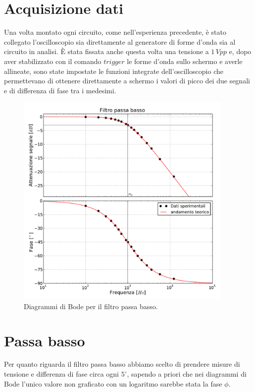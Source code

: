 \section{Acquisizione dati}
Una volta montato ogni circuito, come nell'esperienza precedente, è stato collegato l'oscilloscopio sia direttamente al generatore di forme d'onda sia al circuito in analisi. 
\`E stata fissata anche questa volta una tensione a $1\,Vpp$ e, dopo aver stabilizzato con il comando $trigger$ le forme d'onda sullo schermo e averle allineate, sono state impostate le funzioni integrate dell'oscilloscopio che permettevano di ottenere direttamente a schermo i valori di picco dei due segnali e di differenza di fase tra i medesimi.\phantom{maperchédevosempreognivoltamettereapostolecoseconunphantom?melospieghi?chestoria!}\begin{figure}
    \includegraphics[width=105mm]{low.pdf}
    \caption{Diagrammi di Bode per il filtro passa basso.}
    \label{fig:low}
\end{figure}

\section{Passa basso}

Per quanto riguarda il filtro passa basso abbiamo scelto di prendere misure di tensione e differenza di fase circa ogni $5^{\circ}$, sapendo a priori che nei diagrammi di Bode l'unico valore non graficato con un logaritmo sarebbe stata la fase $\phi$.

